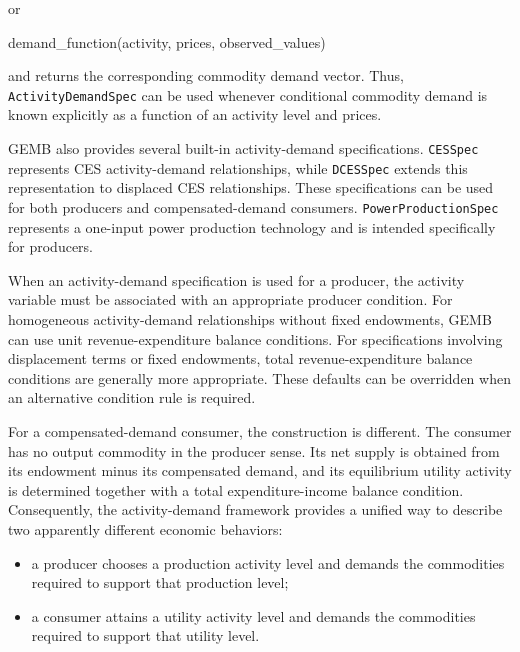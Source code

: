 \documentclass[
  letterpaper,
  DIV=11,
  numbers=noendperiod]{scrreprt}
\newenvironment{Shaded}{\begin{snugshade}}{\end{snugshade}}
\newcommand{\FunctionTok}[1]{\textcolor[rgb]{0.28,0.35,0.67}{#1}}
\newcommand{\NormalTok}[1]{\textcolor[rgb]{0.00,0.23,0.31}{#1}}
\providecommand{\tightlist}{%
  \setlength{\itemsep}{0pt}\setlength{\parskip}{0pt}}\usepackage{longtable,booktabs,array}
\begin{document}
or

\begin{Shaded}
\begin{Highlighting}[]
\FunctionTok{demand\_function}\NormalTok{(activity, prices, observed\_values)}
\end{Highlighting}
\end{Shaded}

and returns the corresponding commodity demand vector. Thus,
\texttt{ActivityDemandSpec} can be used whenever conditional commodity
demand is known explicitly as a function of an activity level and
prices.

GEMB also provides several built-in activity-demand specifications.
\texttt{CESSpec} represents CES activity-demand relationships, while
\texttt{DCESSpec} extends this representation to displaced CES
relationships. These specifications can be used for both producers and
compensated-demand consumers. \texttt{PowerProductionSpec} represents a
one-input power production technology and is intended specifically for
producers.

When an activity-demand specification is used for a producer, the
activity variable must be associated with an appropriate producer
condition. For homogeneous activity-demand relationships without fixed
endowments, GEMB can use unit revenue-expenditure balance conditions.
For specifications involving displacement terms or fixed endowments,
total revenue-expenditure balance conditions are generally more
appropriate. These defaults can be overridden when an alternative
condition rule is required.

For a compensated-demand consumer, the construction is different. The
consumer has no output commodity in the producer sense. Its net supply
is obtained from its endowment minus its compensated demand, and its
equilibrium utility activity is determined together with a total
expenditure-income balance condition. Consequently, the activity-demand
framework provides a unified way to describe two apparently different
economic behaviors:

\begin{itemize}
\tightlist
\item
  a producer chooses a production activity level and demands the
  commodities required to support that production level;
\item
  a consumer attains a utility activity level and demands the
  commodities required to support that utility level.
\end{itemize}
\end{document}
